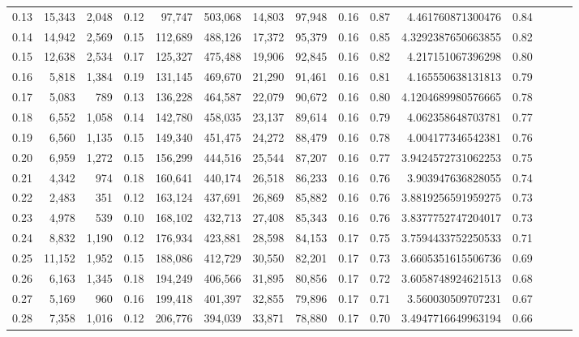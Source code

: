 \begin{tabular}{rrrrrrrrrrrrrrr}
0.13 &  15,343 &  2,048 &  0.12 &   97,747 &  503,068 &   14,803 &   97,948 &  0.16 &  0.87 &     4.461760871300476 &      0.84 \\
0.14 &  14,942 &  2,569 &  0.15 &  112,689 &  488,126 &   17,372 &   95,379 &  0.16 &  0.85 &    4.3292387650663855 &      0.82 \\
0.15 &  12,638 &  2,534 &  0.17 &  125,327 &  475,488 &   19,906 &   92,845 &  0.16 &  0.82 &     4.217151067396298 &      0.80 \\
0.16 &   5,818 &  1,384 &  0.19 &  131,145 &  469,670 &   21,290 &   91,461 &  0.16 &  0.81 &     4.165550638131813 &      0.79 \\
0.17 &   5,083 &    789 &  0.13 &  136,228 &  464,587 &   22,079 &   90,672 &  0.16 &  0.80 &    4.1204689980576665 &      0.78 \\
0.18 &   6,552 &  1,058 &  0.14 &  142,780 &  458,035 &   23,137 &   89,614 &  0.16 &  0.79 &     4.062358648703781 &      0.77 \\
0.19 &   6,560 &  1,135 &  0.15 &  149,340 &  451,475 &   24,272 &   88,479 &  0.16 &  0.78 &     4.004177346542381 &      0.76 \\
0.20 &   6,959 &  1,272 &  0.15 &  156,299 &  444,516 &   25,544 &   87,207 &  0.16 &  0.77 &    3.9424572731062253 &      0.75 \\
0.21 &   4,342 &    974 &  0.18 &  160,641 &  440,174 &   26,518 &   86,233 &  0.16 &  0.76 &     3.903947636828055 &      0.74 \\
0.22 &   2,483 &    351 &  0.12 &  163,124 &  437,691 &   26,869 &   85,882 &  0.16 &  0.76 &    3.8819256591959275 &      0.73 \\
0.23 &   4,978 &    539 &  0.10 &  168,102 &  432,713 &   27,408 &   85,343 &  0.16 &  0.76 &    3.8377752747204017 &      0.73 \\
0.24 &   8,832 &  1,190 &  0.12 &  176,934 &  423,881 &   28,598 &   84,153 &  0.17 &  0.75 &    3.7594433752250533 &      0.71 \\
0.25 &  11,152 &  1,952 &  0.15 &  188,086 &  412,729 &   30,550 &   82,201 &  0.17 &  0.73 &    3.6605351615506736 &      0.69 \\
0.26 &   6,163 &  1,345 &  0.18 &  194,249 &  406,566 &   31,895 &   80,856 &  0.17 &  0.72 &    3.6058748924621513 &      0.68 \\
0.27 &   5,169 &    960 &  0.16 &  199,418 &  401,397 &   32,855 &   79,896 &  0.17 &  0.71 &     3.560030509707231 &      0.67 \\
0.28 &   7,358 &  1,016 &  0.12 &  206,776 &  394,039 &   33,871 &   78,880 &  0.17 &  0.70 &    3.4947716649963194 &      0.66 \\

\end{tabular}
